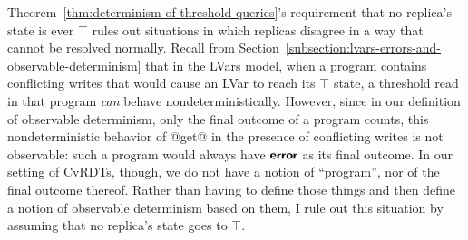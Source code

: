 Theorem~\ref{thm:determinism-of-threshold-queries}'s requirement that
no replica's state is ever $\top$ rules out situations in which
replicas disagree in a way that cannot be resolved normally.  Recall
from Section~\ref{subsection:lvars-errors-and-observable-determinism}
that in the LVars model, when a program contains conflicting writes
that would cause an LVar to reach its $\top$ state, a threshold read
in that program \emph{can} behave nondeterministically.  However,
since in our definition of observable determinism, only the final
outcome of a program counts, this nondeterministic behavior of @get@
in the presence of conflicting writes is not observable: such a
program would always have $\textbf{\textsf{error}}$ as its final outcome.  In our
setting of CvRDTs, though, we do not have a notion of ``program'', nor
of the final outcome thereof.  Rather than having to define those
things and then define a notion of observable determinism based on
them, I rule out this situation by assuming that no replica's state
goes to $\top$.



